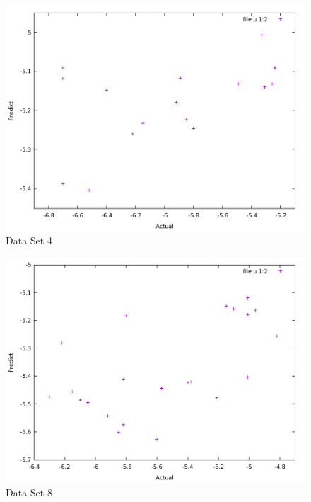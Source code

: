\documentclass[uplatex,a4j]{jsarticle}
\begin{document}
  \begin{figure}[H]
    \begin{center}
      \includegraphics[width=14cm]{pre4.pdf}
      \caption{Data Set 4}
      \label{4}
    \end{center}
  \end{figure}
  \begin{figure}[H]
    \begin{center}
      \includegraphics[width=14cm]{pre8.pdf}
      \caption{Data Set 8}
      \label{8}
    \end{center}
  \end{figure}
  
\end{document}
